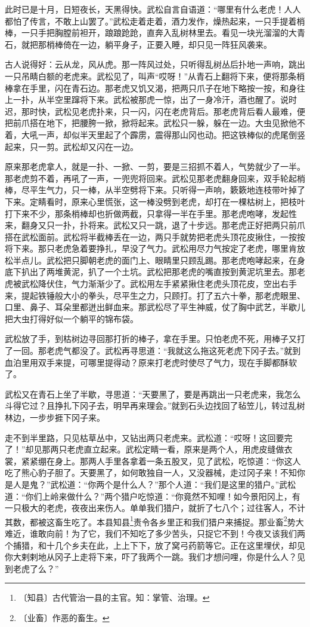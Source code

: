 \documentclass[12pt,UTF-8,openany]{ctexbook}
\begin{document}
\begin{Large}
    此时已是十月，日短夜长，天黑得快。武松自言自语道：“哪里有什么老虎！人人都怕了传言，不敢上山罢了。”武松走着走着，酒力发作，燥热起来，一只手提着梢棒，一只手把胸膛前袒开，踉踉跄跄，直奔入乱树林里去。看见一块光溜溜的大青石，就把那梢棒倚在一边，躺平身子，正要入睡，却只见一阵狂风袭来。
    
    古人说得好：云从龙，风从虎。那一阵风过处，只听得乱树丛后扑地一声响，跳出一只吊睛白额的老虎来。武松见了，叫声“哎呀！”从青石上翻将下来，便将那条梢棒拿在手里，闪在青石边。那老虎又饥又渴，把两只爪子在地下略按一按，和身往上一扑，从半空里蹿将下来。武松被那虎一惊，出了一身冷汗，酒也醒了。说时迟，那时快，武松见老虎扑来，只一闪，闪在老虎背后。那老虎背后看人最难，便把前爪搭在地下，把腰胯一掀，掀将起来。武松只一躲，躲在一边。大虫见掀他不着，大吼一声，却似半天里起了个霹雳，震得那山冈也动。把这铁棒似的虎尾倒竖起来，只一剪。武松却又闪在一边。
    
    原来那老虎拿人，就是一扑、一掀、一剪，要是三招抓不着人，气势就少了一半。那老虎剪不着，再吼了一声，一兜兜将回来。武松见那老虎翻身回来，双手轮起梢棒，尽平生气力，只一棒，从半空劈将下来。只听得一声响，簌簌地连枝带叶掉了下来。定睛看时，原来心里慌张，这一棒没劈到老虎，却打在一棵枯树上，把枝叶打下来不少，那条梢棒却也折做两截，只拿得一半在手里。那老虎咆哮，发起性来，翻身又只一扑，扑将来。武松又只一跳，退了十步远。那老虎正好把两只前爪搭在武松面前。武松将半截棒丢在一边，两只手就势把老虎头顶花皮揪住，一按按将下来。那只老虎急着要挣扎，早没了气力。武松用尽力气按定了老虎，哪里肯放松半点儿。武松把只脚朝老虎的面门上、眼睛里只顾乱踢。那老虎咆哮起来，在身底下扒出了两堆黄泥，扒了一个土坑。武松把那老虎的嘴直按到黄泥坑里去。那老虎被武松降伏住，气力渐渐少了。武松用左手紧紧揪住老虎头顶花皮，空出右手来，提起铁锤般大小的拳头，尽平生之力，只顾打。打了五六十拳，那老虎眼里、口里、鼻子、耳朵里都迸出鲜血来。那武松尽了平生神威，仗了胸中武艺，半歇儿把大虫打得好似一个躺平的锦布袋。
    
    武松放了手，到枯树边寻回那打折的棒子，拿在手里。只怕老虎不死，用棒子又打了一回。那老虎气都没了。武松再寻思道：“我就这么拖这死老虎下冈子去。”就到血泊里用双手来提，可哪里提得动？原来打老虎时使尽了气力，现在手脚都酥软了。
    
    武松又在青石上坐了半歇，寻思道：“天要黑了，要是再跳出一只老虎来，我怎么斗得它过？且挣扎下冈子去，明早再来理会。”就到石头边找回了毡笠儿，转过乱树林边，一步步捱下冈子来。
    
    走不到半里路，只见枯草丛中，又钻出两只老虎来。武松道：“哎呀！这回要完了！”却见那两只老虎直立起来。武松定睛一看，原来是两个人，用虎皮缝做衣裳，紧紧绷在身上。那两人手里各拿着一条五股叉，见了武松，吃惊道：“你这人吃了熊心豹子胆了。天要黑了，如何敢独自一人，又没器械，走过冈子来！不知你是人是鬼？”武松道：“你两个是什么人？”那个人道：“我们是这里的猎户。”武松道：“你们上岭来做什么？”两个猎户吃惊道：“你竟然不知哩！如今景阳冈上，有一只极大的老虎，夜夜出来伤人。单单我们猎户，就折了七八个；过往客人，不计其数，都被这畜生吃了。本县知县\footnote{〔知县〕古代管治一县的主官。知：掌管、治理。}责令各乡里正和我们猎户来捕捉。那业畜\footnote{〔业畜〕作恶的畜生。}势大难近，谁敢向前！为了它，我们不知吃了多少苦头，只捉它不到！今夜又该我们两个捕猎，和十几个乡夫在此，上上下下，放了窝弓药箭等它。正在这里埋伏，却见你大剌剌地从冈子上走将下来，吓了我两个一跳。我们才想问哩，你是什么人？见到老虎了么？”
    

\end{Large}
\end{document}
